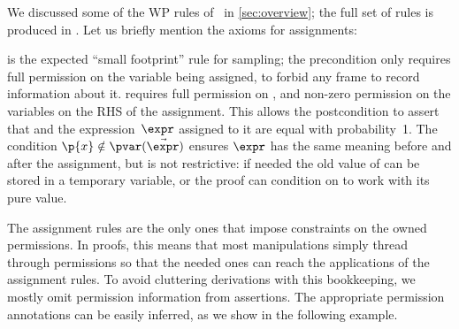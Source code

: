 \documentclass[acmsmall,nonacm,screen,appendix]{acmart}
\begin{document}
We discussed some of the WP rules of \thelogic\ in \cref{sec:overview};
the full set of rules is produced in .
Let us briefly mention the axioms for assignments:
\begin{proofrules}\small
         \label{rule:wp-samp}

     \label{rule:wp-assign}
  \end{proofrules}
 is the expected ``small footprint'' rule for
sampling; the precondition only requires full permission on the variable
being assigned, to forbid any frame to record information about it.
 requires full permission on ,
and non-zero permission on the variables on the RHS of the assignment.
This allows the postcondition to assert that  and the expression~$\expr$
assigned to it are equal with probability~1.
The condition $\p{x} \notin \pvar(\vec{\expr})$ ensures $\expr$ has the same
meaning before and after the assignment, but is not restrictive:
if needed the old value of  can be stored in a temporary variable,
or the proof can condition on  to work with its pure value.


The assignment rules are the only ones that impose constraints on the owned
permissions.
In proofs, this means that most manipulations simply thread through permissions
so that the needed ones can reach the applications of the assignment rules.
To avoid cluttering derivations with this bookkeeping,
we mostly omit permission information from assertions.
The appropriate permission annotations can be easily inferred,
as we show in the following example.
\end{document}
